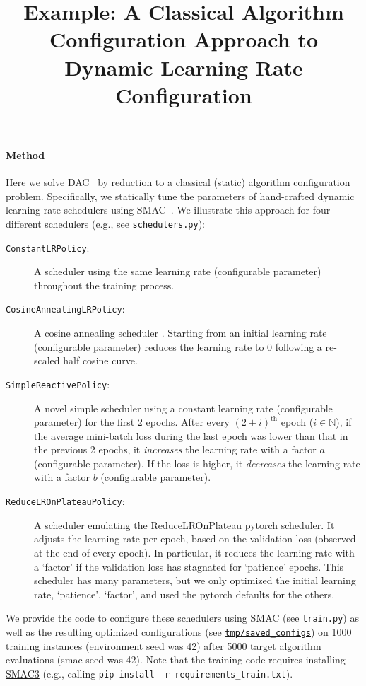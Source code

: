 \documentclass[11pt, final]{article}
\title{Example: A Classical Algorithm Configuration Approach to Dynamic Learning Rate Configuration}
\author[1]{\nameemail{Steven Adriaensen}{adriaens@cs.uni-freiburg.de}}
\author[1]{\nameemail{G\"{o}ktu\u{g} Karaka\c{s}l{\i}}{karakasg@cs.uni-freiburg.de}}
\affil[1]{University of Freiburg}
\begin{document}
\maketitle

\paragraph{Method} Here we solve DAC~\citep{biedenkapp-ecai20} by reduction to a classical (static) algorithm configuration problem. Specifically, we statically tune the parameters of hand-crafted dynamic learning rate schedulers using SMAC~\citep{hutter-lion11a}. We illustrate this approach for four different schedulers (e.g., see \texttt{schedulers.py}):
\begin{description}
\item[\texttt{ConstantLRPolicy}:] A scheduler using the same learning rate (configurable parameter) throughout the training process.
\item[\texttt{CosineAnnealingLRPolicy}:] A cosine annealing scheduler \citep{loshchilov-iclr17a}. Starting from an initial learning rate (configurable parameter) reduces the learning rate to 0 following a re-scaled half cosine curve.
\item[\texttt{SimpleReactivePolicy}:] A novel simple scheduler using a constant learning rate (configurable parameter) for the first 2 epochs. After every $(2+i)^{\textrm{th}}$ epoch ($i \in \mathbb{N}$), if the average mini-batch loss during the last epoch was lower than that in the previous 2 epochs, it \emph{increases} the learning rate with a factor $a$ (configurable parameter). If the loss is higher, it \emph{decreases} the learning rate with a factor ${b}$ (configurable parameter). 
\item[\texttt{ReduceLROnPlateauPolicy}:] A scheduler emulating the \href{https://pytorch.org/docs/stable/generated/torch.optim.lr_scheduler.ReduceLROnPlateau.html}{ReduceLROnPlateau} pytorch scheduler. It adjusts the learning rate per epoch, based on the validation loss (observed at the end of every epoch). In particular, it reduces the learning rate with a `factor' if the validation loss has stagnated for `patience' epochs. This scheduler has many parameters, but we only optimized the initial learning rate, `patience', `factor', and used the pytorch defaults for the others.
\end{description}
We provide the code to configure these schedulers using SMAC (see \texttt{train.py}) as well as the resulting optimized configurations (see \texttt{\url{tmp/saved_configs}}) on 1000 training instances (environment seed was 42) after 5000 target algorithm evaluations (smac seed was 42). Note that the training code requires installing \href{https://github.com/automl/SMAC3}{SMAC3} (e.g., calling \texttt{pip install -r requirements\_train.txt}).
\end{document}

